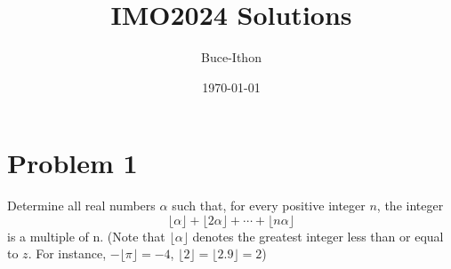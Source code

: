 \documentclass{Math_Note}
\title{IMO2024 Solutions}
\author{Buce-Ithon}
\date{\today}
\begin{document}
\maketitle

\newpage
\tableofcontents
\newpage

\section*{Problem 1}
\begin{prb}
    Determine all real numbers $\alpha$ such that, for every positive integer $n$, the integer
    \begin{equation}
        \lfloor\alpha\rfloor + \lfloor 2\alpha \rfloor + \cdots + \lfloor n\alpha \rfloor
    \end{equation}
    is a multiple of n.
    (Note that $\lfloor\alpha\rfloor$ denotes the greatest integer less than or equal to $z$. For 
    instance, $-\lfloor\pi\rfloor=-4$, $\lfloor2\rfloor=\lfloor2.9\rfloor=2$)
\end{prb}
\end{document}
